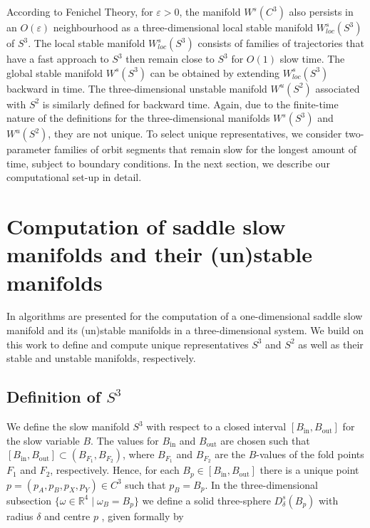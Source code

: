 \documentclass{ws-ijbc}
\begin{document}
According to Fenichel Theory, for $\varepsilon > 0$, the manifold $W^{s}(C^3)$ also persists in an $O(\varepsilon)$ neighbourhood as a three-dimensional local stable manifold $W^{s}_{loc}(S^3)$ of $S^3$.  The local stable manifold $W^{s}_{loc}(S^3)$ consists of families of trajectories that have a fast approach to $S^3$ then remain close to $S^3$ for $O(1)$ slow time.  The global stable manifold $W^{s}(S^3)$ can be obtained by extending $W^{s}_{loc}(S^3)$ backward in time.  The three-dimensional unstable manifold $W^{u}(S^2)$ associated with $S^2$ is similarly defined for backward time.  Again, due to the finite-time nature of the definitions for the three-dimensional manifolds $W^{s}(S^3)$ and $W^{u}(S^2)$, they are not unique.  To select unique representatives, we consider two-parameter families of orbit segments that remain slow for the longest amount of time, subject to boundary conditions.  In the next section, we describe our computational set-up in detail.  
 
 \section{Computation of saddle slow manifolds and their (un)stable manifolds}

In \cite{Saeed_Paper} algorithms are presented for the computation of a one-dimensional saddle slow manifold and its (un)stable manifolds in a three-dimensional system.  We build on this work to define and compute unique representatives $S^3$ and $S^2$ as well as their stable and unstable manifolds, respectively.

\subsection{Definition of $S^3$}    
We define the slow manifold $S^3$ with respect to a closed interval $[B_{\mathrm{in}},B_{\mathrm{out}}]$ for the slow variable $B$.  The values for $B_{\mathrm{in}}$ and $B_{\mathrm{out}}$ are chosen such that $[B_{\mathrm{in}},B_{\mathrm{out}}] \subset (B_{F_1}, B_{F_2})$, where $B_{F_1}$ and $B_{F_2}$ are the $B$-values of the fold points $F_1$ and $F_2$, respectively.  Hence, for each $B_p \in [B_{\mathrm{in}},B_{\mathrm{out}}]$ there is a unique point $p=(p_A,p_B,p_X,p_Y) \in C^3$ such that $p_B = B_p$.  In the three-dimensional subsection $\{ \omega \in \mathbb{R}^4 \; | \; \omega_B=B_p\}$ we define a solid three-sphere $D^s_\delta(B_p)$ with radius $\delta$ and centre $p$ , given formally by
\end{document}
